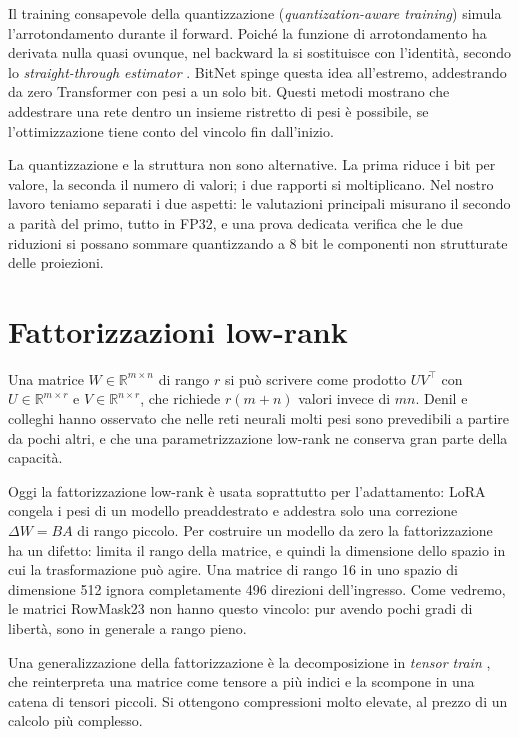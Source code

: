 Il training consapevole della quantizzazione (\emph{quantization-aware training}) simula l'arrotondamento durante il forward. Poiché la funzione di arrotondamento ha derivata nulla quasi ovunque, nel backward la si sostituisce con l'identità, secondo lo \emph{straight-through estimator} \cite{bengio2013estimating}. BitNet \cite{wang2023bitnet} spinge questa idea all'estremo, addestrando da zero Transformer con pesi a un solo bit. Questi metodi mostrano che addestrare una rete dentro un insieme ristretto di pesi è possibile, se l'ottimizzazione tiene conto del vincolo fin dall'inizio.

La quantizzazione e la struttura non sono alternative. La prima riduce i bit per valore, la seconda il numero di valori; i due rapporti si moltiplicano. Nel nostro lavoro teniamo separati i due aspetti: le valutazioni principali misurano il secondo a parità del primo, tutto in FP32, e una prova dedicata verifica che le due riduzioni si possano sommare quantizzando a 8 bit le componenti non strutturate delle proiezioni.

\section{Fattorizzazioni low-rank}

Una matrice $W\in\mathbb{R}^{m\times n}$ di rango $r$ si può scrivere come prodotto $UV^\top$ con $U\in\mathbb{R}^{m\times r}$ e $V\in\mathbb{R}^{n\times r}$, che richiede $r(m+n)$ valori invece di $mn$. Denil e colleghi \cite{denil2013predicting} hanno osservato che nelle reti neurali molti pesi sono prevedibili a partire da pochi altri, e che una parametrizzazione low-rank ne conserva gran parte della capacità.

Oggi la fattorizzazione low-rank è usata soprattutto per l'adattamento: LoRA \cite{hu2022lora} congela i pesi di un modello preaddestrato e addestra solo una correzione $\Delta W = BA$ di rango piccolo. Per costruire un modello da zero la fattorizzazione ha un difetto: limita il rango della matrice, e quindi la dimensione dello spazio in cui la trasformazione può agire. Una matrice di rango 16 in uno spazio di dimensione 512 ignora completamente 496 direzioni dell'ingresso. Come vedremo, le matrici RowMask23 non hanno questo vincolo: pur avendo pochi gradi di libertà, sono in generale a rango pieno.

Una generalizzazione della fattorizzazione è la decomposizione in \emph{tensor train} \cite{novikov2015tensorizing}, che reinterpreta una matrice come tensore a più indici e la scompone in una catena di tensori piccoli. Si ottengono compressioni molto elevate, al prezzo di un calcolo più complesso.


